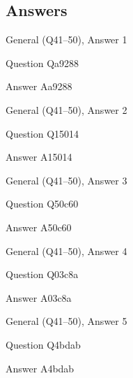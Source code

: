 \documentclass[11pt]{beamer}
\begin{document}
\subsection{Answers}

\begin{frame}[t]{General (Q41--50), Answer 1}
\vspace{2em}
\begin{block}{Question}
Qa9288
\end{block}
\pause{}
\begin{block}{Answer}
Aa9288
\end{block}
\end{frame}
    

\begin{frame}[t]{General (Q41--50), Answer 2}
\vspace{2em}
\begin{block}{Question}
Q15014
\end{block}
\pause{}
\begin{block}{Answer}
A15014
\end{block}
\end{frame}
    

\begin{frame}[t]{General (Q41--50), Answer 3}
\vspace{2em}
\begin{block}{Question}
Q50c60
\end{block}
\pause{}
\begin{block}{Answer}
A50c60
\end{block}
\end{frame}
    

\begin{frame}[t]{General (Q41--50), Answer 4}
\vspace{2em}
\begin{block}{Question}
Q03c8a
\end{block}
\pause{}
\begin{block}{Answer}
A03c8a
\end{block}
\end{frame}
    

\begin{frame}[t]{General (Q41--50), Answer 5}
\vspace{2em}
\begin{block}{Question}
Q4bdab
\end{block}
\pause{}
\begin{block}{Answer}
A4bdab
\end{block}
\end{frame}
    
\end{document}
